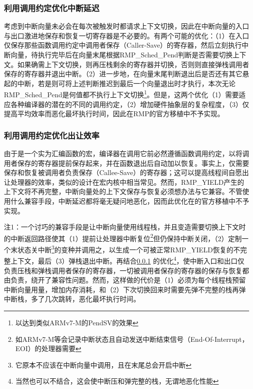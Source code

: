 \subsubsection{利用调用约定优化中断延迟}\label{subsubsec:using-the-calling-convention-to-optimise-interrupt-latency}

\protect{}\label{subsubsec:using-the-calling-convention-to-optimise-interrupt-latency-2}考虑到中断向量未必会在每次被触发时都请求上下文切换，因此在中断向量的入口与出口激进地保存和恢复一切寄存器是不必要的。有两个可能的优化：（1）在入口仅保存那些函数调用约定中调用者保存（Caller-Save）的寄存器，然后立刻执行中断向量，待执行完毕后在向量末尾根据RMP\_Sched\_Pend判断是否需要切换上下文。如果确需上下文切换，则再压栈剩余的寄存器并切换，否则则直接弹栈调用者保存的寄存器并退出中断。（2）进一步地，在向量末尾判断退出后是否还有其它悬起的中断，若是则可将上述判断推迟到最后一个向量退出时才执行，本次无论RMP\_Sched\_Pend是何值都不执行上下文切换\footnote{以达到类似ARMv7-M的PendSV的效果}。但是，这两个优化（1）需要适应各种编译器的潜在的不同的调用约定，（2）增加硬件抽象层的复杂程度，（3）仅提高平均效率而恶化最坏执行时间，因此在RMP的官方移植中不予实现。

\subsubsection{利用调用约定优化出让效率}\label{subsubsec:using-the-calling-convention-to-optimise-yield-efficiency}

由于是一个实为汇编函数的宏，编译器在调用它前必然遵循函数调用约定，以将调用者保存的寄存器提前保存起来，并在函数退出后自动加以恢复。事实上，仅需要保存和恢复被调用者负责保存（Callee-Save）的寄存器；这可以提高线程间自愿出让处理器的效率，类似的设计在宏内核中相当常见。然而，RMP\_YIELD产生的上下文将不再完整，中断向量处的上下文保存与恢复必须想办法与它兼容。不管使用什么兼容手段，中断延迟都将毫无疑问地恶化，因而此优化在的官方移植中不予实现。

注1：一个讨巧的兼容手段是让中断向量使用线程栈，并且变造需要切换上下文时的中断返回路径使其（1）提前让处理器中断复位\footnote{如ARMv7-M等会记录中断状态且自动发送中断结束信号（End-Of-Interrupt，EOI）的处理器需要}但仍保持中断关闭，（2）定制一个末状态关中断\footnote{它原本不应该在中断向量中调用，且在末尾总会开启中断}的变种并调用之，以生成一个可被正常RMP\_YIELD恢复的不完整上下文，最后（3）弹栈退出中断。再结合\ref{subsubsec:using-the-calling-convention-to-optimise-interrupt-latency}
的优化\footnote{当然也可以不结合，这会使中断压和弹完整的栈，无谓地恶化性能}，使中断入口和出口仅负责压栈和弹栈调用者保存的寄存器，一切被调用者保存的寄存器的保存与恢复都由负责，绕开了兼容性问题。然而，这样做的代价是（1）必须为每个线程栈预留中断向量用量，增加内存消耗，和（2）下次切换回来时需要先弹不完整的栈再弹中断栈，多了几次跳转，恶化最坏执行时间。

